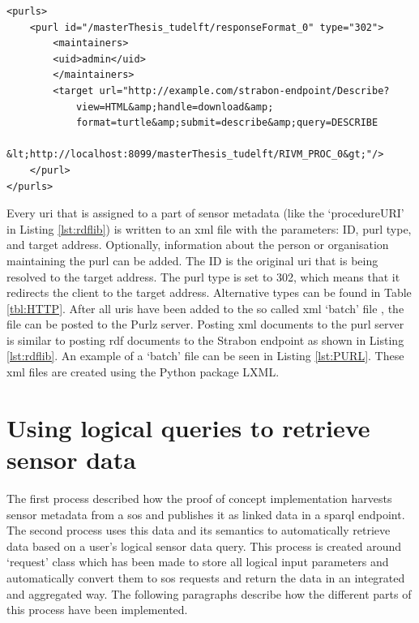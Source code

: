 \begin{lstlisting}[float,caption={Example of a PURL batch file (containing one PURL)}, label={lst:PURL}]
<purls>
	<purl id="/masterThesis_tudelft/responseFormat_0" type="302">
		<maintainers>
		<uid>admin</uid>
		</maintainers>
		<target url="http://example.com/strabon-endpoint/Describe?
			view=HTML&amp;handle=download&amp;
			format=turtle&amp;submit=describe&amp;query=DESCRIBE 
			&lt;http://localhost:8099/masterThesis_tudelft/RIVM_PROC_0&gt;"/>
	</purl>
</purls>
\end{lstlisting}

Every \ac{uri} that is assigned to a part of sensor metadata (like the `procedureURI' in Listing \ref{lst:rdflib}) is written to an \ac{xml} file with the parameters: ID, \ac{purl} type, and target address. Optionally, information about the person or organisation maintaining the \ac{purl} can be added. The ID is the original \ac{uri} that is being resolved to the target address. The \ac{purl} type is set to 302, which means that it redirects the client to the target address. Alternative types can be found in Table \ref{tbl:HTTP}. After all \acp{uri} have been added to the so called \ac{xml} `batch' file \citep{LD:PURL2}, the file can be posted to the Purlz server. Posting \ac{xml} documents to the \ac{purl} server is similar to posting \ac{rdf} documents to the Strabon endpoint as shown in Listing \ref{lst:rdflib}. An example of a `batch' file can be seen in Listing \ref{lst:PURL}. These \ac{xml} files are created using the Python package LXML. 


\section{Using logical queries to retrieve sensor data}
\label{par:logicalQuery}
The first process described how the proof of concept implementation harvests sensor metadata from a \ac{sos} and publishes it as linked data in a \ac{sparql} endpoint. The second process uses this data and its semantics to automatically retrieve data based on a user's logical sensor data query. This process is created around `request' class which has been made to store all logical input parameters and automatically convert them to \ac{sos} requests and return the data in an integrated and aggregated way. The following paragraphs describe how the different parts of this process have been implemented.

